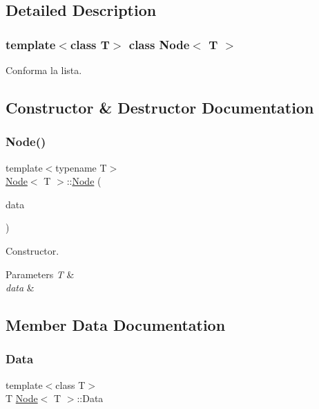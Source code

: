 \subsection{Detailed Description}
\subsubsection*{template$<$class T$>$\newline
class Node$<$ T $>$}

Conforma la lista. 

\subsection{Constructor \& Destructor Documentation}
\mbox{\label{classNode_ab2f2bd0551fbce8ee80741462c9c86ef}} 
\subsubsection{\texorpdfstring{Node()}{Node()}}
{\footnotesize\ttfamily template$<$typename T$>$ \\
\hyperlink{classNode}{Node}$<$ T $>$\+::\hyperlink{classNode}{Node} (\begin{DoxyParamCaption}\item[{T}]{data }\end{DoxyParamCaption})}



Constructor. 


\begin{DoxyParams}{Parameters}
{\em T} & \\
\hline
{\em data} & \\
\hline
\end{DoxyParams}


\subsection{Member Data Documentation}
\mbox{\label{classNode_a02a7efb2ba05a45fdfb2d5dc3519926d}} 
\subsubsection{\texorpdfstring{Data}{Data}}
{\footnotesize\ttfamily template$<$class T$>$ \\
T \hyperlink{classNode}{Node}$<$ T $>$\+::Data}


